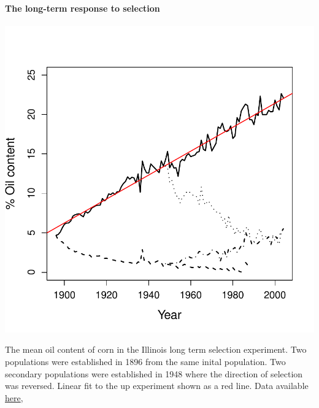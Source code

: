  \paragraph{The long-term response to selection}
   \begin{marginfigure}
 \begin{center}
 \includegraphics[width=\textwidth]{Journal_figs/Quant_gen/Illinois_long_term_selection_corn/Illinois_LTS_means.pdf} \end{center}
 \caption{The mean oil content of corn in the Illinois long term
   selection experiment. Two populations were established in 1896 from
 the same inital population. Two secondary populations were
 established in 1948 where the direction of selection was reversed.
 Linear fit to the up experiment shown as a red line. Data available \href{https://www.ideals.illinois.edu/handle/2142/3525}{here}, }\label{Fig:Illinois_LTS_means}
\end{marginfigure}


